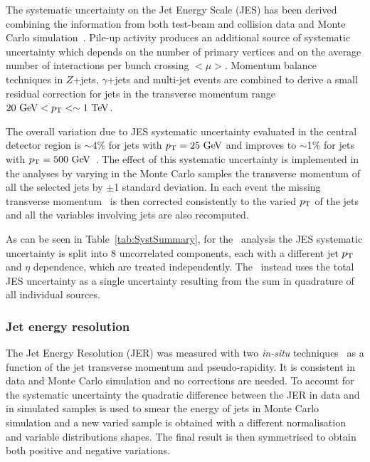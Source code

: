 The systematic uncertainty on the Jet Energy Scale (JES) 
has been derived combining the information from both test-beam 
and collision data and Monte Carlo
simulation~\cite{jes, insitu5,insitu6}.  
Pile-up activity produces an additional source of systematic 
uncertainty which depends on the number of primary vertices
and on the average number of interactions per bunch crossing $<\mu>$. 
Momentum balance techniques in $Z$+jets, $\gamma$+jets and 
multi-jet events are combined to derive a small residual correction
for jets in the transverse momentum range $20\gev<\pt<\sim1\tev$.

The overall variation due to JES systematic uncertainty 
evaluated in the central detector region 
is $\sim$4\% for jets with $\pt=25\gev$ and improves to $\sim$1\% for  
jets with $\pt=500\gev$~\cite{jesuncertainty}.
The effect of this systematic uncertainty is 
implemented in the analyses by varying in the Monte Carlo samples the 
transverse momentum of all the selected jets by $\pm$1 standard deviation.
In each event the missing transverse momentum \met\ is then corrected consistently to 
the varied $\pt$ of the jets and all the variables involving jets are also
recomputed.

As can be seen in Table~\ref{tab:SystSummary}, for the \htx\ analysis
the JES systematic uncertainty is split into 8
uncorrelated components, each with a different jet $\pt$ and $\eta$
dependence, which are treated independently.
The \wbx\ instead uses the total JES uncertainty as a single uncertainty
resulting from the sum in quadrature of all individual sources.



\subsubsection{Jet energy resolution}
\label{sec:syst_jer}

The Jet Energy Resolution (JER) was measured 
with two {\em in-situ} techniques~\cite{jes}
as a function of the jet transverse momentum and pseudo-rapidity.
It is consistent in data and Monte Carlo simulation and no corrections
are needed.
To account for the systematic uncertainty the quadratic difference 
between the JER in data and in simulated samples is used
to smear the energy of jets in Monte Carlo simulation and a new
varied sample is obtained with a different normalisation and 
variable distributions shapes. The final result is then symmetrised
to obtain both positive and negative variations.


